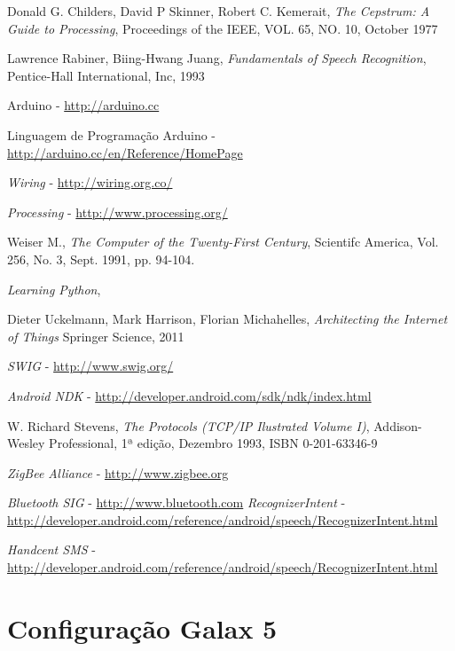 \documentclass[12pt,a4paper,oneside]{report}
\begin{document}
\begin{thebibliography}{99}
	Donald G. Childers, David P Skinner, Robert C. Kemerait,
	\emph{The Cepstrum: A Guide to Processing}, 
	Proceedings of the IEEE, VOL. 65, NO. 10, October 1977

	Lawrence Rabiner, Biing-Hwang Juang,
	\emph{Fundamentals of Speech Recognition},
	Pentice-Hall International, Inc, 1993

	Arduino - \url{http://arduino.cc}
    
	Linguagem de Programação Arduino - \url{http://arduino.cc/en/Reference/HomePage}

	\emph{Wiring} - \url{http://wiring.org.co/}

	\emph{Processing} - \url{http://www.processing.org/}

	Weiser M.,
	\emph{The Computer of the Twenty-First Century},
	Scientifc America, Vol. 256, No. 3, Sept. 1991, pp. 94-104.

	\emph{Learning Python},
	
	Dieter Uckelmann, Mark Harrison, Florian Michahelles,
	\emph{Architecting the Internet of Things}
	Springer Science, 2011

	\emph{SWIG} - \url{http://www.swig.org/}

	\emph{Android NDK} - \url{http://developer.android.com/sdk/ndk/index.html}

	W. Richard Stevens,
	\emph{The Protocols (TCP/IP Ilustrated Volume I)},
	Addison-Wesley Professional, 1ª edição, Dezembro 1993, ISBN 0-201-63346-9

	\emph{ZigBee Alliance} - \url{http://www.zigbee.org}

	\emph{Bluetooth SIG} - \url{http://www.bluetooth.com}
	\emph{RecognizerIntent} - \url{http://developer.android.com/reference/android/speech/RecognizerIntent.html}

	\emph{Handcent SMS} - \url{http://developer.android.com/reference/android/speech/RecognizerIntent.html}
\end{thebibliography}

\appendix

\chapter{Configuração Galax 5}
\label{chap:config-galax5}
\end{document}

